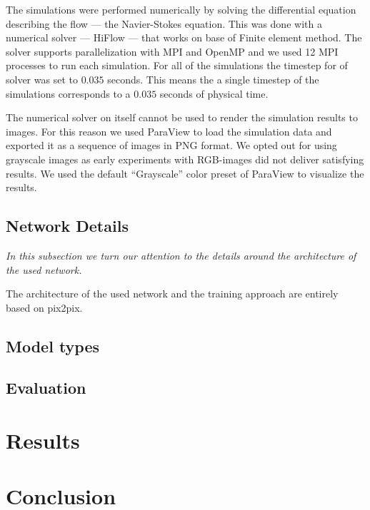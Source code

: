 \documentclass{llncs}
\begin{document}
The simulations were performed numerically by solving the differential equation describing the flow --- the Navier-Stokes equation. This was done with a numerical solver --- HiFlow ---  that works on base of Finite element method. The solver supports parallelization with MPI and OpenMP and we used 12 MPI processes to run each simulation. For all of the simulations the timestep for of solver was set to $0.035$ seconds. This means the a single timestep of the simulations corresponds to a $0.035$ seconds of physical time.

The numerical solver on itself cannot be used to render the simulation results to images. For this reason we used ParaView to load the simulation data and exported it as a sequence of images in PNG format. We opted out for using grayscale images as early experiments with RGB-images did not deliver satisfying results. We used the default ``Grayscale'' color preset of ParaView to visualize the results.

\subsection{Network Details}
\emph{In this subsection we turn our attention to the details around the architecture of the used network.}

The architecture of the used network and the training approach are entirely based on pix2pix. 

\subsection{Model types}

\subsection{Evaluation}

\section{Results}\label{results}



\section{Conclusion}\label{conclusion}



\clearpage


\end{document}
